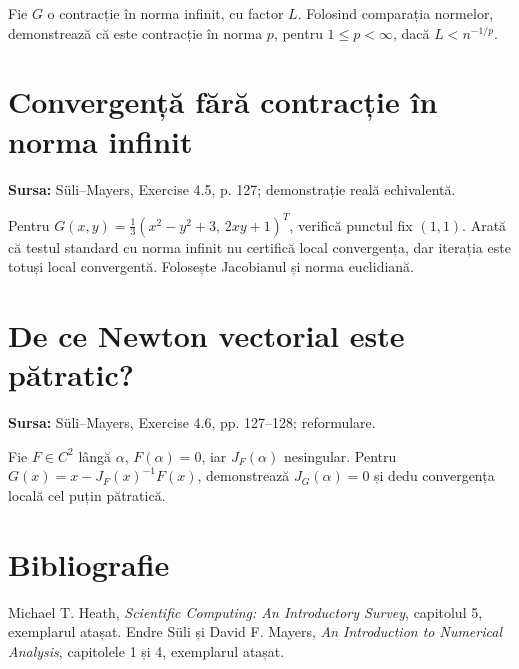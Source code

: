 \documentclass[11pt,a4paper]{article}
\begin{document}
Fie $G$ o contracție în norma infinit, cu factor $L$. Folosind comparația normelor, demonstrează că este contracție în norma $p$, pentru $1\le p<\infty$, dacă $L<n^{-1/p}$.



\section{Convergență fără contracție în norma infinit}
\textbf{Sursa:} Süli--Mayers, Exercise 4.5, p. 127; demonstrație reală echivalentă.

Pentru $G(x,y)=\tfrac13(x^2-y^2+3,\,2xy+1)^T$, verifică punctul fix $(1,1)$. Arată că testul standard cu norma infinit nu certifică local convergența, dar iterația este totuși local convergentă. Folosește Jacobianul și norma euclidiană.



\section{De ce Newton vectorial este pătratic?}
\textbf{Sursa:} Süli--Mayers, Exercise 4.6, pp. 127--128; reformulare.

Fie $F\in C^2$ lângă $\alpha$, $F(\alpha)=0$, iar $J_F(\alpha)$ nesingular. Pentru $G(x)=x-J_F(x)^{-1}F(x)$, demonstrează $J_G(\alpha)=0$ și dedu convergența locală cel puțin pătratică.



\section*{Bibliografie}
Michael T. Heath, \emph{Scientific Computing: An Introductory Survey}, capitolul 5, exemplarul atașat. Endre Süli și David F. Mayers, \emph{An Introduction to Numerical Analysis}, capitolele 1 și 4, exemplarul atașat.
\end{document}
